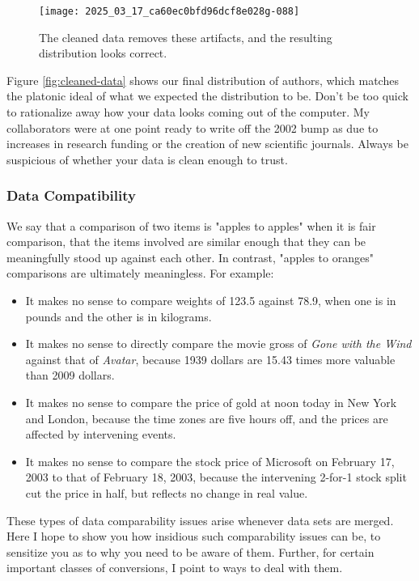 \documentclass[10pt]{article}
\begin{document}
\begin{figure}[ht]
  \centering
  \texttt{[image: 2025\_03\_17\_ca60ec0bfd96dcf8e028g-088]}
  \caption{The cleaned data removes these artifacts, and the resulting distribution looks correct.}
\end{figure}

Figure \ref{fig:cleaned-data} shows our final distribution of authors, which matches the platonic ideal of what we expected the distribution to be. Don't be too quick to rationalize away how your data looks coming out of the computer. My collaborators were at one point ready to write off the 2002 bump as due to increases in research funding or the creation of new scientific journals. Always be suspicious of whether your data is clean enough to trust.

\subsubsection{Data Compatibility}
We say that a comparison of two items is "apples to apples" when it is fair comparison, that the items involved are similar enough that they can be meaningfully stood up against each other. In contrast, "apples to oranges" comparisons are ultimately meaningless. For example:

\begin{itemize}
  \item It makes no sense to compare weights of 123.5 against 78.9, when one is in pounds and the other is in kilograms.
  \item It makes no sense to directly compare the movie gross of \emph{Gone with the Wind} against that of \emph{Avatar}, because 1939 dollars are 15.43 times more valuable than 2009 dollars.
  \item It makes no sense to compare the price of gold at noon today in New York and London, because the time zones are five hours off, and the prices are affected by intervening events.
  \item It makes no sense to compare the stock price of Microsoft on February 17, 2003 to that of February 18, 2003, because the intervening 2-for-1 stock split cut the price in half, but reflects no change in real value.
\end{itemize}

These types of data comparability issues arise whenever data sets are merged. Here I hope to show you how insidious such comparability issues can be, to sensitize you as to why you need to be aware of them. Further, for certain important classes of conversions, I point to ways to deal with them.
\end{document}
